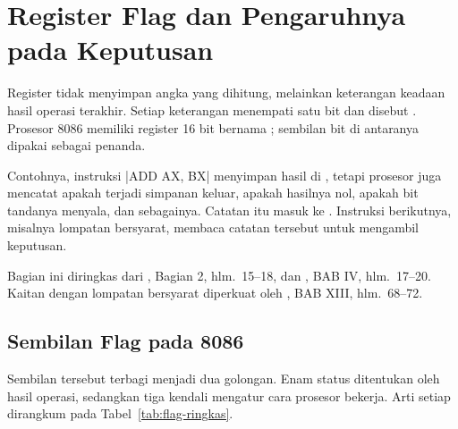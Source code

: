 \section{Register Flag dan Pengaruhnya pada Keputusan}
\label{sec:register-flag}

Register  tidak menyimpan angka yang dihitung, melainkan
keterangan keadaan hasil operasi terakhir. Setiap keterangan
menempati satu bit dan disebut . Prosesor 8086 memiliki
register 16 bit bernama ; sembilan bit di antaranya
dipakai sebagai penanda.

Contohnya, instruksi \lstasm|ADD AX, BX| menyimpan hasil di ,
tetapi prosesor juga mencatat apakah terjadi simpanan keluar, apakah
hasilnya nol, apakah bit tandanya menyala, dan sebagainya. Catatan
itu masuk ke . Instruksi berikutnya, misalnya lompatan
bersyarat, membaca catatan tersebut untuk mengambil keputusan.

Bagian ini diringkas dari \cite{gunawan2019}, Bagian 2, hlm.~15--18,
dan \cite{sto2001}, BAB IV, hlm.~17--20. Kaitan  dengan
lompatan bersyarat diperkuat oleh \cite{sto2001}, BAB XIII,
hlm.~68--72.

\subsection{Sembilan Flag pada 8086}

Sembilan  tersebut terbagi menjadi dua golongan. Enam
 status ditentukan oleh hasil operasi, sedangkan tiga
 kendali mengatur cara prosesor bekerja. Arti setiap
 dirangkum pada Tabel~\ref{tab:flag-ringkas}.

